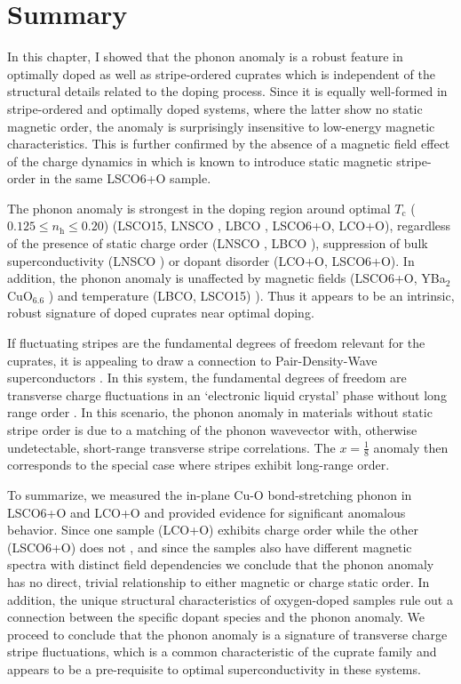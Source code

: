 \section{Summary}
In this chapter, I showed that the phonon anomaly is a robust feature in optimally doped as well as stripe-ordered cuprates which is independent of the structural details related to the doping process. Since it is equally well-formed in stripe-ordered and optimally doped systems, where the latter show no static magnetic order, the anomaly is surprisingly insensitive to low-energy magnetic characteristics. This is further confirmed by the absence of a magnetic field effect of the charge dynamics in  which is known to introduce static magnetic stripe-order in the same LSCO6+O sample.

The phonon anomaly is strongest in the doping region around optimal $T_\text{c}$ ($0.125 \le n_\text{h} \le 0.20$) (LSCO15, LNSCO \cite{Reznik2007}, LBCO \cite{Reznik2006}, LSCO6+O, LCO+O), regardless of the presence of static charge order (LNSCO \cite{Tranquada1995}, LBCO \cite{Fujita2004}), suppression of bulk superconductivity (LNSCO \cite{Tranquada1996}) or dopant disorder (LCO+O, LSCO6+O). In addition, the phonon anomaly is unaffected by magnetic fields (LSCO6+O, YBa$_2$CuO$_{6.6}$ \cite{Reznik2016}) and temperature (LBCO, LSCO15) \cite{Reznik2007}). Thus it appears to be an intrinsic, robust signature of doped cuprates near optimal doping.

If fluctuating stripes are the fundamental degrees of freedom relevant for the cuprates, it is appealing to draw a connection to Pair-Density-Wave superconductors \cite{Fradkin2015}. In this system, the fundamental degrees of freedom are transverse charge fluctuations in an `electronic liquid crystal' phase without long range order \cite{Kivelson1998}. In this scenario, the phonon anomaly in materials without static stripe order is due to a matching of the phonon wavevector with, otherwise undetectable, short-range transverse stripe correlations. The $x=\frac{1}{8}$ anomaly then corresponds to the special case where stripes exhibit long-range order. 

To summarize, we measured the in-plane Cu-O bond-stretching phonon in LSCO6+O and LCO+O and provided evidence for significant anomalous behavior. Since one sample (LCO+O) exhibits charge order \cite{Zhang2018} while the other (LSCO6+O) does not \cite{Holm2019}, and since the samples also have different magnetic spectra with distinct field dependencies \cite{Jacobsen2018, Holm2019} we conclude that the phonon anomaly has no direct, trivial relationship to either magnetic or charge static order. In addition, the unique structural characteristics of oxygen-doped samples rule out a connection between the specific dopant species and the phonon anomaly. We proceed to conclude that the phonon anomaly is a signature of transverse charge stripe fluctuations, which is a common characteristic of the cuprate family and appears to be a pre-requisite to optimal superconductivity in these systems.



